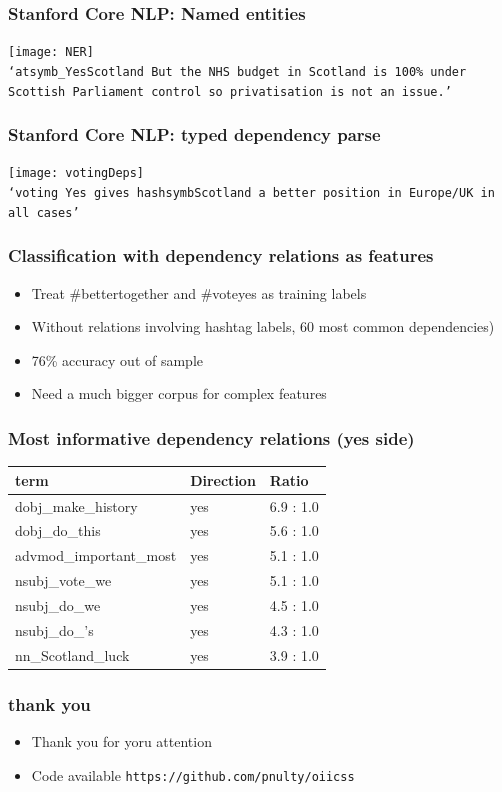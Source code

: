 \documentclass[11pt, table, dvipsnames]{beamer}
\begin{document}
\begin{frame}
  \frametitle{Stanford Core NLP: Named entities}
\texttt{[image: NER]}\\
  \scriptsize
\texttt{`atsymb\_YesScotland But the NHS budget in Scotland is 100\% under Scottish Parliament control so privatisation is not an issue.'}
\end{frame}

\begin{frame}
  \frametitle{Stanford Core NLP: typed dependency parse}
\texttt{[image: votingDeps]}\\
  \scriptsize
\texttt{`voting Yes gives hashsymbScotland a better position in Europe/UK in all cases'}
\end{frame}

\begin{frame}
  \frametitle{Classification with dependency relations as features} 
  \begin{itemize}
  \item Treat \#bettertogether and \#voteyes as training labels 
  \item Without relations involving hashtag labels, 60 most common dependencies)
  \item  76\% accuracy out of sample
  \item Need a much bigger corpus for complex features
  \end{itemize}
\end{frame}

\begin{frame}
  \frametitle{Most informative dependency relations (yes side)} 
\begin{table}[!htbp]\centering
{}
\begin{tabular}{p{5cm}p{1.5cm}p{3cm}}
\hline
term & Direction & Ratio \\
\hline
       dobj\_make\_history &                yes      &      6.9 : 1.0\\
            dobj\_do\_this &                yes      &      5.6 : 1.0\\
   advmod\_important\_most &                yes      &      5.1 : 1.0\\
           nsubj\_vote\_we &                yes      &      5.1 : 1.0\\
             nsubj\_do\_we &                yes      &      4.5 : 1.0\\
             nsubj\_do\_'s &                yes      &      4.3 : 1.0\\
        nn\_Scotland\_luck &                yes      &      3.9 : 1.0\\
\hline
\end{tabular}
\end{table}

\end{frame}

\begin{frame}
  \frametitle{thank you} 
  \begin{itemize}
  \item Thank you for yoru attention
  \item Code available \texttt{https://github.com/pnulty/oiicss}
  \end{itemize}
\end{frame}
\end{document}
